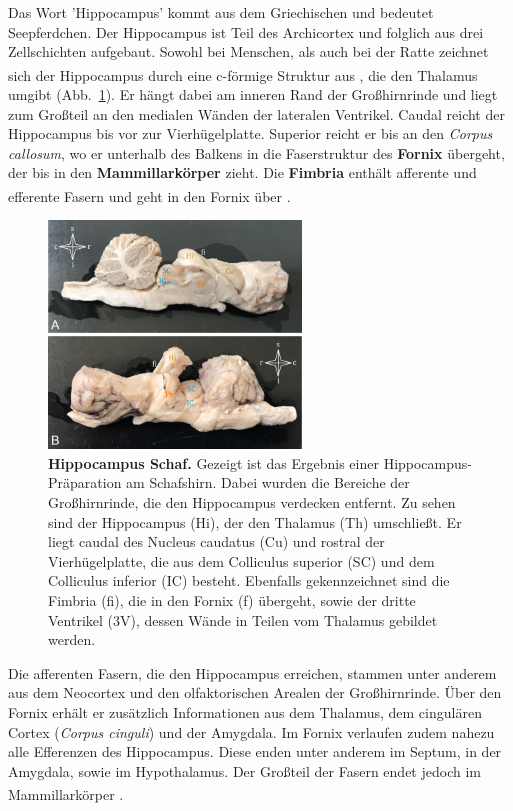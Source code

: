 \documentclass[12pt,a4paper,pdftex]{article}
\begin{document}
Das Wort 'Hippocampus' kommt aus dem Griechischen und bedeutet Seepferdchen. Der Hippocampus ist Teil des Archicortex und folglich aus drei Zellschichten aufgebaut. Sowohl bei Menschen, als auch bei der Ratte zeichnet sich der Hippocampus durch eine c-förmige Struktur aus \textsuperscript{\cite[20]{paxinos2014rat}}, die den Thalamus umgibt (Abb.~\ref{fig:hippocampus_schaf}). Er hängt dabei am inneren Rand der Großhirnrinde und liegt zum Großteil an den medialen Wänden der lateralen Ventrikel. Caudal reicht der Hippocampus bis vor zur Vierhügelplatte. Superior reicht er bis an den \textit{Corpus callosum}, wo er unterhalb des Balkens in die Faserstruktur des \textbf{Fornix} übergeht, der bis in den \textbf{Mammillarkörper} zieht. Die \textbf{Fimbria} enthält afferente und efferente Fasern und geht in den Fornix über \textsuperscript{\cite[9]{trepel2011neuroanatomie}}.\\

\begin{figure}[H]
    \centering
    \includegraphics[width=0.6\textwidth]{pictures/Bilder_Jule/Schaf/Ausschnitte/hippocampus_schaf.png}
    \caption[Hippocampus Schaf]{\textbf{Hippocampus Schaf.} Gezeigt ist das Ergebnis einer Hippocampus-Präparation am Schafshirn. Dabei wurden die Bereiche der Großhirnrinde, die den Hippocampus verdecken entfernt. Zu sehen sind der Hippocampus (Hi), der den Thalamus (Th) umschließt. Er liegt caudal des Nucleus caudatus (Cu) und rostral der Vierhügelplatte, die aus dem Colliculus superior (SC) und dem Colliculus inferior (IC) besteht. Ebenfalls gekennzeichnet sind die Fimbria (fi), die in den Fornix (f) übergeht, sowie der dritte Ventrikel (3V), dessen Wände in Teilen vom Thalamus gebildet werden.}
    \label{fig:hippocampus_schaf}
\end{figure}{}

\noindent Die afferenten Fasern, die den Hippocampus erreichen, stammen unter anderem aus dem Neocortex und den olfaktorischen Arealen der Großhirnrinde. Über den Fornix erhält er zusätzlich Informationen aus dem Thalamus, dem cingulären Cortex (\textit{Corpus cinguli}) und der Amygdala. Im Fornix verlaufen zudem nahezu alle Efferenzen des Hippocampus. Diese enden unter anderem im Septum, in der Amygdala, sowie im Hypothalamus. Der Großteil der Fasern endet jedoch im Mammillarkörper \textsuperscript{\cite[9]{trepel2011neuroanatomie}}.\\
\end{document}
